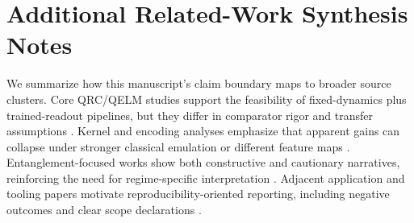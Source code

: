 \section{Additional Related-Work Synthesis Notes}\label{app:rw_notes}
We summarize how this manuscript's claim boundary maps to broader source clusters. Core QRC/QELM studies support the feasibility of fixed-dynamics plus trained-readout pipelines, but they differ in comparator rigor and transfer assumptions \citep{S001,S003,S004,S010,S023,S029,S032,S033,S036,S039}. Kernel and encoding analyses emphasize that apparent gains can collapse under stronger classical emulation or different feature maps \citep{S006,S007,S020,S022,S030,S035}. Entanglement-focused works show both constructive and cautionary narratives, reinforcing the need for regime-specific interpretation \citep{S002,S012,S018,S019,S025,S026,S028,S034,S038}. Adjacent application and tooling papers motivate reproducibility-oriented reporting, including negative outcomes and clear scope declarations \citep{S008,S009,S011,S013,S014,S015,S016,S017,S021,S024,S027,S031,S037}.
